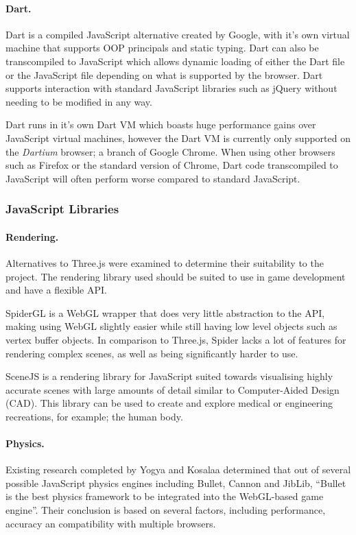 \documentclass[a4paper, 12pt]{article}
\begin{document}
\paragraph{Dart.}
Dart is a compiled JavaScript alternative created by Google, with it's own virtual machine that supports OOP principals and static typing. Dart can also be transcompiled to JavaScript which allows dynamic loading of either the Dart file or the JavaScript file depending on what is supported by the browser.\cite{dart} Dart supports interaction with standard JavaScript libraries such as jQuery without needing to be modified in any way.

Dart runs in it's own Dart VM which boasts huge performance gains over JavaScript virtual machines, however the Dart VM is currently only supported on the \emph{Dartium} browser; a branch of Google Chrome. When using other browsers such as Firefox or the standard version of Chrome, Dart code transcompiled to JavaScript will often perform worse compared to standard JavaScript.\cite{dartperformance}

\subsubsection{JavaScript Libraries}

\paragraph{Rendering.}
Alternatives to Three.js were examined to determine their suitability to the project. The rendering library used should be suited to use in game development and have a flexible API.

SpiderGL is a WebGL wrapper that does very little abstraction to the API, making using WebGL slightly easier while still having low level objects such as vertex buffer objects.\cite{spidergl} In comparison to Three.js, Spider lacks a lot of features for rendering complex scenes, as well as being significantly harder to use.

SceneJS is a rendering library for JavaScript suited towards visualising highly accurate scenes with large amounts of detail similar to Computer-Aided Design (CAD). This library can be used to create and explore medical or engineering recreations, for example; the human body.

\paragraph{Physics.}
Existing research completed by Yogya and Kosalaa determined that out of several possible JavaScript physics engines including Bullet, Cannon and JibLib, ``Bullet is the best physics framework to be integrated into the WebGL-based game engine''.\cite{yogya2014comparison} Their conclusion is based on several factors, including performance, accuracy an compatibility with multiple browsers. 
\end{document}
